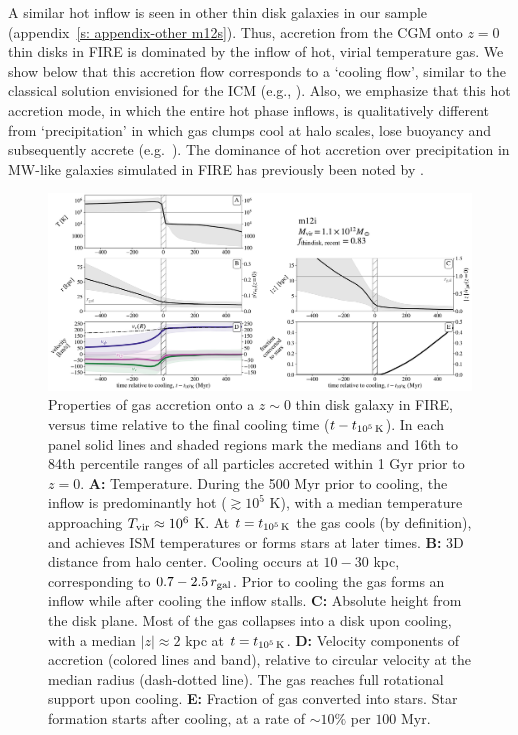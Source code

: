 \documentclass[fleqn,usenatbib]{mnras}
\newcommand{\tcon}{t_{10^5\,{\rm K}}}
\newcommand{\Tvir}{T_{\rm vir}}
\begin{document}
A similar hot inflow is seen in other thin disk galaxies in our sample (appendix~\ref{s: appendix-other m12s}).
Thus, accretion from the CGM onto $z=0$ thin disks in FIRE is dominated by the inflow of hot, virial temperature gas.
We show below that this accretion flow corresponds to a `cooling flow', similar to the classical solution envisioned for the ICM (e.g., \citealt{Mathews1978}).
Also, we emphasize that this hot accretion mode, in which the entire hot phase inflows, is qualitatively different from `precipitation' in which gas clumps cool at halo scales, lose buoyancy and subsequently accrete (e.g.~\citealt{Maller2004,Voit2017}). The dominance of hot accretion over precipitation in MW-like galaxies simulated in FIRE has previously been noted by \cite{Esmerian2021}. 

\begin{figure}
\includegraphics[width=\textwidth]{figures/before_and_after/before_and_after_characteristics_m12i_md.pdf}
\caption{
Properties of gas accretion onto a $z\sim0$ thin disk galaxy in FIRE, versus time relative to the final cooling time ($t - \tcon$).
In each panel solid lines and shaded regions mark the medians and 16th to 84th percentile ranges of all particles accreted within 1 Gyr prior to $z=0$. 
\textbf{A:}
Temperature.
During the 500 Myr prior to cooling, the inflow is predominantly hot ($\gtrsim 10^5$ K), with a median temperature approaching $\Tvir\approx10^6$ K.
At $t = \tcon$ the gas cools (by definition), and achieves ISM temperatures or forms stars at later times. 
\textbf{B:}
3D distance from halo center.
Cooling occurs at $10-30$ kpc, corresponding to $0.7-2.5\,r_{\rm gal}$.
Prior to cooling the gas forms an inflow while after cooling the inflow stalls.
\textbf{C:}
Absolute height from the disk plane.
Most of the gas collapses into a disk upon cooling, with a median $\vert z \vert \approx 2$ kpc at $t=\tcon$.
\textbf{D:}
Velocity components of accretion (colored lines and band), relative to circular velocity at the median radius (dash-dotted line).
The gas reaches full rotational support upon cooling.
\textbf{E:}
Fraction of gas converted into stars.
Star formation starts after cooling, at a rate of $\sim10\%$ per $100$ Myr. 
}
\label{f: before and after A}
\end{figure}
\end{document}
